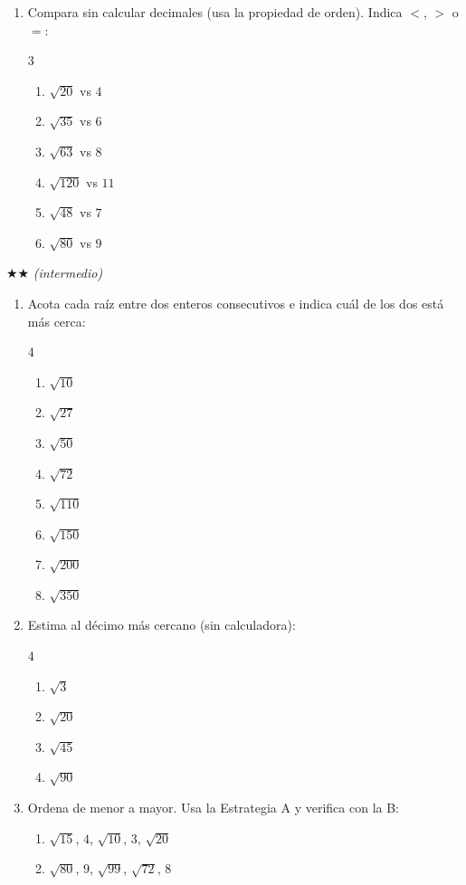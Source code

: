 \documentclass[11pt, letterpaper]{article}
\begin{document}
\begin{enumerate}[label=\textbf{\arabic*.}, leftmargin=*]
  \item Compara sin calcular decimales (usa la propiedad de orden). Indica $<$, $>$ o $=$:
  \begin{multicols}{3}
  \begin{enumerate}[label=\alph*)]
    \item $\sqrt{20}$ \quad vs \quad $4$
    \item $\sqrt{35}$ \quad vs \quad $6$
    \item $\sqrt{63}$ \quad vs \quad $8$
    \item $\sqrt{120}$ \quad vs \quad $11$
    \item $\sqrt{48}$ \quad vs \quad $7$
    \item $\sqrt{80}$ \quad vs \quad $9$
  \end{enumerate}
  \end{multicols}
\end{enumerate}

$\bigstar\bigstar$ \textit{(intermedio)}

\begin{enumerate}[label=\textbf{\arabic*.}, leftmargin=*, resume]
  \item Acota cada raíz entre dos enteros consecutivos e indica cuál de los dos está más cerca:
  \begin{multicols}{4}
  \begin{enumerate}[label=\alph*)]
    \item $\sqrt{10}$
    \item $\sqrt{27}$
    \item $\sqrt{50}$
    \item $\sqrt{72}$
    \item $\sqrt{110}$
    \item $\sqrt{150}$
    \item $\sqrt{200}$
    \item $\sqrt{350}$
  \end{enumerate}
  \end{multicols}

  \item Estima al décimo más cercano (sin calculadora):
  \begin{multicols}{4}
  \begin{enumerate}[label=\alph*)]
    \item $\sqrt{3}$
    \item $\sqrt{20}$
    \item $\sqrt{45}$
    \item $\sqrt{90}$
  \end{enumerate}
  \end{multicols}

  \item Ordena de menor a mayor. Usa la Estrategia A y verifica con la B:
  \begin{enumerate}[label=\alph*)]
    \item $\sqrt{15}$, $4$, $\sqrt{10}$, $3$, $\sqrt{20}$
    \item $\sqrt{80}$, $9$, $\sqrt{99}$, $\sqrt{72}$, $8$
  \end{enumerate}
\end{enumerate}
\end{document}
